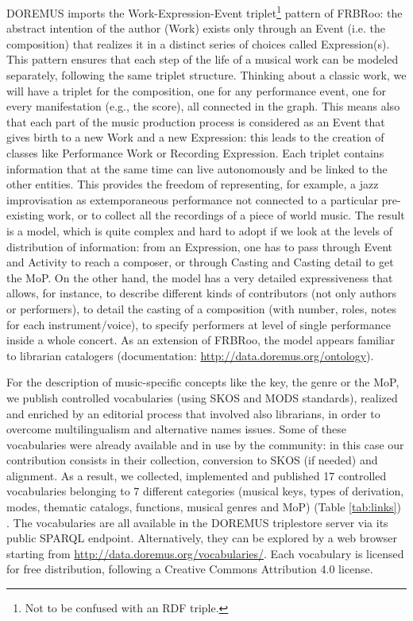 DOREMUS imports the Work-Expression-Event triplet\footnote{Not to be confused with an RDF triple.} pattern of FRBRoo: the abstract intention of the author (Work) exists only through an Event (i.e. the composition) that realizes it in a distinct series of choices called Expression(s). This pattern ensures that each step of the life of a musical work can be modeled separately, following the same triplet structure. Thinking about a classic work, we will have a triplet for the composition, one for any performance event, one for every manifestation (e.g., the score), all connected in the graph. This means also that each part of the music production process is considered as an Event that gives birth to a new Work and a new Expression: this leads to the creation of classes like Performance Work or Recording Expression. Each triplet contains information that at the same time can live autonomously and be linked to the other entities. This provides the freedom of representing, for example, a jazz improvisation as extemporaneous performance not connected to a particular pre-existing work, or to collect all the recordings of a piece of world music. The result is a model, which is quite complex and hard to adopt if we look at the levels of distribution of information: from an Expression, one has to pass through Event and Activity to reach a composer, or through Casting and Casting detail to get the MoP. On the other hand, the model has a very detailed expressiveness that allows, for instance, to describe different kinds of contributors (not only authors or performers), to detail the casting of a composition (with number, roles, notes for each instrument/voice), to specify performers at level of single performance inside a whole concert. As an extension of FRBRoo, the model appears familiar to librarian catalogers (documentation: \url{http://data.doremus.org/ontology}).

For the description of music-specific concepts like the  key, the genre or the MoP, we publish controlled vocabularies (using SKOS and MODS standards), realized and enriched by an editorial process that involved also librarians, in order to overcome multilingualism and alternative names issues. Some of these vocabularies were already available and in use by the community: in this case our contribution consists in their collection, conversion to SKOS (if needed) and alignment. As a result, we collected, implemented and published 17 controlled vocabularies belonging to 7 different categories (musical keys, types of derivation, modes, thematic catalogs, functions, musical genres and MoP) (Table \ref{tab:links}) \cite{lisena2018vocabularies}. The vocabularies are all available in the DOREMUS triplestore server via its public SPARQL endpoint. Alternatively, they can be explored by a web browser starting from \url{http://data.doremus.org/vocabularies/}. Each vocabulary is licensed for free distribution, following a Creative Commons Attribution 4.0 license. 


